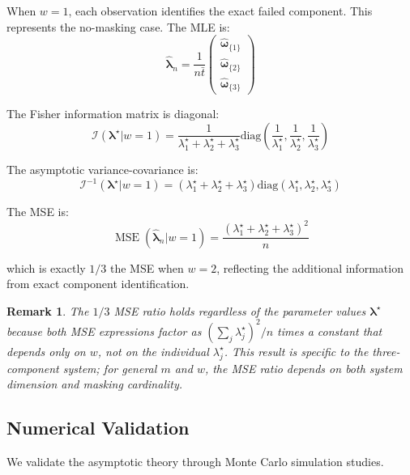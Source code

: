 \documentclass[pdflatex,sn-mathphys-num,Numbered]{sn-jnl}
\newcommand{\tparam}[1]{{#1}^{\star}}  %
\newcommand{\expomle}{\boldsymbol{\hat{\lambda}}_n}
\newcommand{\infomatrx}{\mathcal{I}}
\newcommand{\cntsymb}{\boldsymbol{\hat\omega}}
\newcommand{\cnt}[1]{\cntsymb_{\{#1\}}}
\renewcommand{\vec}[1]{\boldsymbol{#1}}
\DeclareMathOperator{\MSE}{\mathrm{MSE}}
\theoremstyle{thmstyleone}
\theoremstyle{thmstylethree}
\theoremstyle{thmstyletwo}
\newtheorem{remark}[theorem]{Remark}
\begin{document}
When $w=1$, each observation identifies the exact failed component. This represents the no-masking case. The MLE is:
\begin{equation}
\expomle = \frac{1}{n\bar{t}} \begin{pmatrix} \cnt{1}\\ \cnt{2}\\ \cnt{3} \end{pmatrix}
\end{equation}

The Fisher information matrix is diagonal:
\begin{equation}
\infomatrx(\tparam{\vec{\lambda}} | w=1) = \frac{1}{\tparam{\lambda}_1 + \tparam{\lambda}_2 + \tparam{\lambda}_3} \text{diag}\left(\frac{1}{\tparam{\lambda}_1}, \frac{1}{\tparam{\lambda}_2}, \frac{1}{\tparam{\lambda}_3}\right)
\end{equation}

The asymptotic variance-covariance is:
\begin{equation}
\infomatrx^{-1}(\tparam{\vec{\lambda}} | w=1) = (\tparam{\lambda}_1 + \tparam{\lambda}_2 + \tparam{\lambda}_3) \text{diag}(\tparam{\lambda}_1, \tparam{\lambda}_2, \tparam{\lambda}_3)
\end{equation}

The MSE is:
\begin{equation}
\MSE(\expomle | w=1) = \frac{(\tparam{\lambda}_1 + \tparam{\lambda}_2 + \tparam{\lambda}_3)^2}{n}
\end{equation}

which is exactly $1/3$ the MSE when $w=2$, reflecting the additional information from exact component identification.

\begin{remark}
The $1/3$ MSE ratio holds regardless of the parameter values $\tparam{\vec{\lambda}}$ because both MSE expressions factor as $(\sum_j \tparam{\lambda}_j)^2/n$ times a constant that depends only on $w$, not on the individual $\tparam{\lambda}_j$. This result is specific to the three-component system; for general $m$ and $w$, the MSE ratio depends on both system dimension and masking cardinality.
\end{remark}

\subsection{Numerical Validation}

We validate the asymptotic theory through Monte Carlo simulation studies.
\label{subsec:validation}
\end{document}

